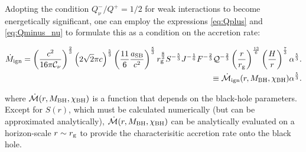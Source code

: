 Adopting the condition $Q^-_\nu/Q^+ = 1/2$ for weak interactions to become energetically significant, one can employ the expressions \eqref{eq:Qplus} and \eqref{eq:Qminus_nu} to formulate this as a condition on the accretion rate:

\begin{eqnarray}
\dot{M}_{\rm ign} = \left(\frac{c^2}{16\pi \mathcal{C}_\nu }\right)^{\frac{2}{3}} \left(2\sqrt{2}\pi c\right)^{\frac{5}{3}} \left(\frac{11}{6}\frac{a_{\rm SB}}{c^2}\right)^{\frac{5}{3}} r_{\rm g}^{\frac{8}{3}} S^{-\frac{5}{3}} J^{-\frac{1}{6}}F^{-\frac{2}{3}} \mathcal{Q}^{-\frac{2}{3}}\left(\frac{r}{r_{\rm g}}\right)^{\frac{13}{6}}\left(\frac{H}{r}\right)^{\frac{7}{3}} \alpha^{\frac{5}{3}}. \\
\equiv \dot{\mathcal{M}}_{\rm ign}(r,M_{\rm BH},\chi_{\rm BH}) \alpha^{\frac{5}{3}}.
\end{eqnarray}

where $\dot{\mathcal{M}}(r,M_{\rm BH},\chi_{\rm BH})$ is a function that depends on the black-hole parameters. Except for $S(r)$, which must be calculated numerically (but can be approximated analytically), $\dot{\mathcal{M}}(r,M_{\rm BH},\chi_{\rm BH})$ can be analytically evaluated on a horizon-scale $r\sim r_{\rm g}$ to provide the characterisitic accretion rate onto the black hole.
